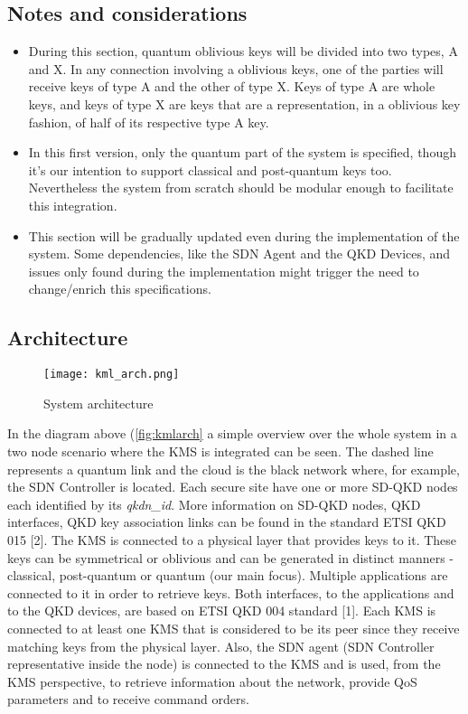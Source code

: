 \begin{refsection}
\subsection{Notes and considerations}
\begin{itemize}
	\item During this section, quantum oblivious keys will be divided into two types, A and X. In any connection involving a oblivious keys, one of the parties will receive keys of type A and the other of type X. Keys of type A are whole keys, and keys of type X are keys that are a representation, in a oblivious key fashion, of half of its respective type A key.
	\item In this first version, only the quantum part of the system is specified, though it's our intention to support classical and post-quantum keys too. Nevertheless the system from scratch should be modular enough to facilitate this integration. 
	\item This section will be gradually updated even during the implementation of the system. Some dependencies, like the SDN Agent and the QKD Devices, and issues only found during the implementation might trigger the need to change/enrich this specifications. 
\end{itemize}


\subsection{Architecture}

\begin{figure}[H]
	\centering
	\texttt{[image: kml\_arch.png]}
	\caption{System architecture}
	\label{fig:kmlarch}
\end{figure}

In the diagram above (\autoref{fig:kmlarch} a simple overview over the whole system in a two node scenario where the \ac{KMS} is integrated can be seen. The dashed line represents a quantum link and the cloud is the black network where, for example, the \ac{SDN} Controller is located. Each secure site have one or more SD-QKD nodes each identified by its \textit{qkdn\_id}. More information on SD-QKD nodes, QKD interfaces, QKD key association links can be found in the standard ETSI QKD 015 [2]. The \ac{KMS} is connected to a physical layer that provides keys to it. These keys can be symmetrical or oblivious and can be generated in distinct manners - classical, post-quantum or quantum (our main focus). Multiple applications are connected to it in order to retrieve keys. Both interfaces, to the applications and to the QKD devices, are based on ETSI QKD 004 standard [1]. Each KMS is connected to at least one KMS that is considered to be its peer since they receive matching keys from the physical layer. Also, the \ac{SDN} agent (\ac{SDN} Controller representative inside the node) is connected to the \ac{KMS} and is used, from the \ac{KMS} perspective, to retrieve information about the network, provide QoS parameters and to receive command orders.


\end{refsection}
